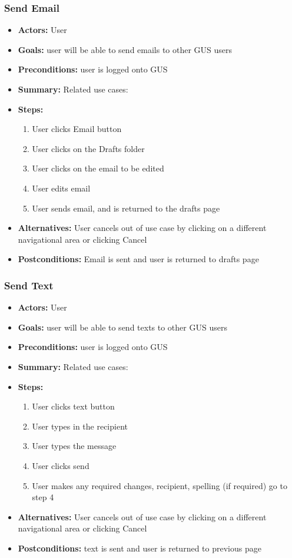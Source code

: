          \subsubsection{Send Email}
			\begin{itemize}
				\item{\textbf{Actors:} User}
				\item{\textbf{Goals:} user will be able to send emails to other GUS users}
				\item{\textbf{Preconditions:} user is logged onto GUS}
				\item{\textbf{Summary:} Related use cases: }
				\item{\textbf{Steps:}
				\begin{enumerate}
					\item{User clicks Email button}
					\item{User clicks on the Drafts folder}
					\item{User clicks on the email to be edited}
					\item{User edits email}
					\item{User sends email, and is returned to the drafts page}
				\end{enumerate}
				}
				\item{\textbf{Alternatives:} User cancels out of use case by clicking on a different navigational area or clicking Cancel}
				\item{\textbf{Postconditions:} Email is sent and user is returned to drafts page}
			\end{itemize}
         \subsubsection{Send Text}
			\begin{itemize}
				\item{\textbf{Actors:} User}
				\item{\textbf{Goals:} user will be able to send texts to other GUS users}
				\item{\textbf{Preconditions:} user is logged onto GUS}
				\item{\textbf{Summary:} Related use cases: }
				\item{\textbf{Steps:}
				\begin{enumerate}
					\item{User clicks text button}
					\item{User types in the recipient}
					\item{User types the message}
					\item{User clicks send}
					\item{User makes any required changes, recipient, spelling (if required) go to step 4}
				\end{enumerate}
				}
				\item{\textbf{Alternatives:} User cancels out of use case by clicking on a different navigational area or clicking Cancel}
				\item{\textbf{Postconditions:} text is sent and user is returned to previous page}
			\end{itemize}
